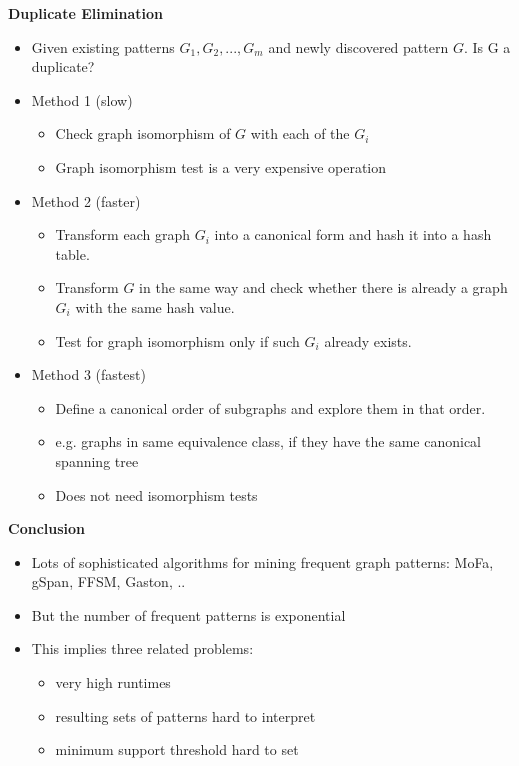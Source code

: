 \documentclass[../notes.tex]{subfiles}
\begin{document}
\textbf{Duplicate Elimination}
\begin{itemize}
  \item Given existing patterns $G_1, G_2, ..., G_m$ and newly discovered pattern $G$. Is G a duplicate?
  \item Method 1 (slow)
  \begin{itemize}
    \item Check graph isomorphism of $G$ with each of the $G_i$
    \item Graph isomorphism test is a very expensive operation
  \end{itemize}

  \item Method 2 (faster)
  \begin{itemize}
    \item Transform each graph $G_i$ into a canonical form and hash it into a hash table.
    \item Transform $G$ in the same way and check whether there is already a graph $G_i$ with the same hash value.
    \item Test for graph isomorphism only if such $G_i$ already exists.
  \end{itemize}

  \item Method 3 (fastest)
  \begin{itemize}
    \item Define a canonical order of subgraphs and explore them in that order.
    \item e.g. graphs in same equivalence class, if they have the same canonical spanning tree
    \item Does not need isomorphism tests
  \end{itemize}
\end{itemize}

\textbf{Conclusion}
\begin{itemize}
  \item Lots of sophisticated algorithms for mining frequent graph patterns: MoFa, gSpan, FFSM, Gaston, ..
  \item But the number of frequent patterns is exponential
  \item This implies three related problems:
  \begin{itemize}
    \item very high runtimes
    \item resulting sets of patterns hard to interpret
    \item minimum support threshold hard to set
  \end{itemize}
\end{itemize}
\end{document}
